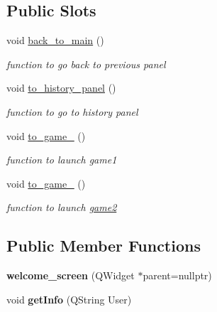 \subsection*{Public Slots}
\begin{DoxyCompactItemize}
\item 
\mbox{\label{classwelcome__screen_a9b00fa23427b130623c72f431c8ba2b0}} 
void \hyperlink{classwelcome__screen_a9b00fa23427b130623c72f431c8ba2b0}{back\+\_\+to\+\_\+main} ()
\begin{DoxyCompactList}\small\item\em function to go back to previous panel \end{DoxyCompactList}\item 
\mbox{\label{classwelcome__screen_aa526875e6d6603ae5965a97e595b5861}} 
void \hyperlink{classwelcome__screen_aa526875e6d6603ae5965a97e595b5861}{to\+\_\+history\+\_\+panel} ()
\begin{DoxyCompactList}\small\item\em function to go to history panel \end{DoxyCompactList}\item 
\mbox{\label{classwelcome__screen_ae5c1c63124959f987d47221660a7b9e2}} 
void \hyperlink{classwelcome__screen_ae5c1c63124959f987d47221660a7b9e2}{to\+\_\+game\+\_} ()
\begin{DoxyCompactList}\small\item\em function to launch game1 \end{DoxyCompactList}\item 
\mbox{\label{classwelcome__screen_a2ef003f0a4e358566320edca2c43f2c2}} 
void \hyperlink{classwelcome__screen_a2ef003f0a4e358566320edca2c43f2c2}{to\+\_\+game\+\_} ()
\begin{DoxyCompactList}\small\item\em function to launch \hyperlink{classgame2}{game2} \end{DoxyCompactList}\end{DoxyCompactItemize}
\subsection*{Public Member Functions}
\begin{DoxyCompactItemize}
\item 
\mbox{\label{classwelcome__screen_ad6a325fcec3b8692297bc9929b320ab8}} 
{\bfseries welcome\+\_\+screen} (Q\+Widget $\ast$parent=nullptr)
\item 
\mbox{\label{classwelcome__screen_abeea501e43052b285a11fdf6d7156ad4}} 
void {\bfseries get\+Info} (Q\+String User)
\end{DoxyCompactItemize}
